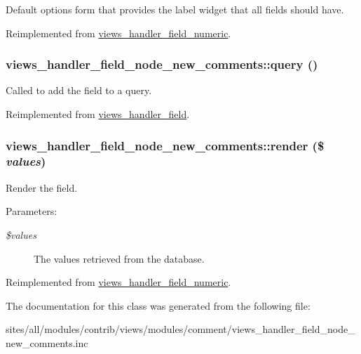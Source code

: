 Default options form that provides the label widget that all fields should have. 

Reimplemented from \hyperlink{classviews__handler__field__numeric_e6f81d1896ece64e9450ebc2d60da2fd}{views\_\-handler\_\-field\_\-numeric}.\hypertarget{classviews__handler__field__node__new__comments_b49cfad0c25d081f0ee70e2e0d0db809}{
\subsubsection[{query}]{\setlength{\rightskip}{0pt plus 5cm}views\_\-handler\_\-field\_\-node\_\-new\_\-comments::query ()}}
\label{classviews__handler__field__node__new__comments_b49cfad0c25d081f0ee70e2e0d0db809}


Called to add the field to a query. 

Reimplemented from \hyperlink{classviews__handler__field_4f661f91bcbe80d4a00c30a31456c502}{views\_\-handler\_\-field}.\hypertarget{classviews__handler__field__node__new__comments_6b1e79531ba28eb32e71c7ff2129e82d}{
\subsubsection[{render}]{\setlength{\rightskip}{0pt plus 5cm}views\_\-handler\_\-field\_\-node\_\-new\_\-comments::render (\$ {\em values})}}
\label{classviews__handler__field__node__new__comments_6b1e79531ba28eb32e71c7ff2129e82d}


Render the field.

\begin{Desc}
\item[Parameters:]
\begin{description}
\item[{\em \$values}]The values retrieved from the database. \end{description}
\end{Desc}


Reimplemented from \hyperlink{classviews__handler__field__numeric_9c76aeef951c45385fd91a22e5e656aa}{views\_\-handler\_\-field\_\-numeric}.

The documentation for this class was generated from the following file:\begin{CompactItemize}
\item 
sites/all/modules/contrib/views/modules/comment/views\_\-handler\_\-field\_\-node\_\-new\_\-comments.inc\end{CompactItemize}
